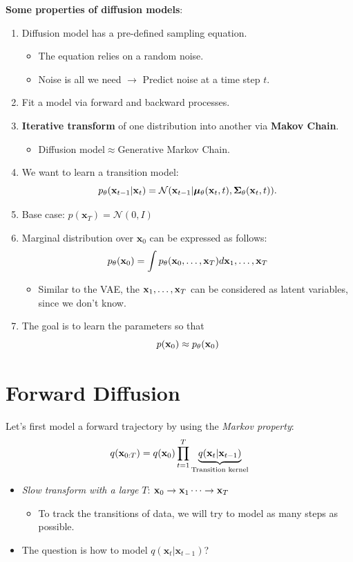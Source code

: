 \textbf{Some properties of diffusion models}:
\begin{enumerate}
	\item Diffusion model has a pre-defined sampling equation.
		\begin{itemize}
			\item The equation relies on a random noise.
			\item Noise is all we need $\to$ Predict noise at a time step $t$.
		\end{itemize}
	\item Fit a model via forward and backward processes.
	\item \textbf{Iterative transform} of one distribution into another via \textbf{Makov Chain}.
		\begin{itemize}
			\item Diffusion model$\approx$Generative Markov Chain.
		\end{itemize}
	\item We want to learn a transition model:
		$$p_\theta(\mathbf{x}_{t-1}|{\mathbf{x}}_t) = \mathcal{N}(\mathbf{x}_{t-1}|\boldsymbol{\mu}_{\theta}(\mathbf{x}_{t}, t), \boldsymbol{\Sigma}_\theta(\mathbf{x}_t,t)).$$
	\item Base case: $p(\mathbf{x}_T) = \mathcal{N}(0,I)$ 
	\item Marginal distribution over $\mathbf{x}_0$ can be expressed as follows:
		$$p_\theta(\mathbf{x}_0) = \int p_\theta({\mathbf{x}}_0,\dots,\mathbf{x}_T)d{\mathbf{x}}_1,\dots,{\mathbf{x}}_T$$
		\begin{itemize}
			\item Similar to the VAE, the ${\mathbf{x}}_1,\dots, {\mathbf{x}}_T$ can be considered as latent variables, since we don't know. 
		\end{itemize}
	\item The goal is to learn the parameters so that
		$$p({\mathbf{x}}_0)\approx p_\theta({\mathbf{x}}_0)$$
\end{enumerate}

\section{Forward Diffusion}
Let's first model a forward trajectory by using the \textit{Markov property}: 
$$q(\mathbf{x}_{0:T}) = q({\mathbf{x}}_0)\prod^T_{t=1} \underbrace{q(\mathbf{x}_t \vert \mathbf{x}_{t-1})}_{\text{Transition kernel}} $$
\begin{itemize}
	\item \textit{Slow transform with a large} $T$: ${\mathbf{x}}_0\to {\mathbf{x}}_1\cdots\to {\mathbf{x}}_T$
		\begin{itemize}
			\item To track the transitions of data, we will try to model as many steps as possible.
		\end{itemize}
	\item The question is how to model $q(\mathbf{x}_t \vert \mathbf{x}_{t-1})$?
\end{itemize}

